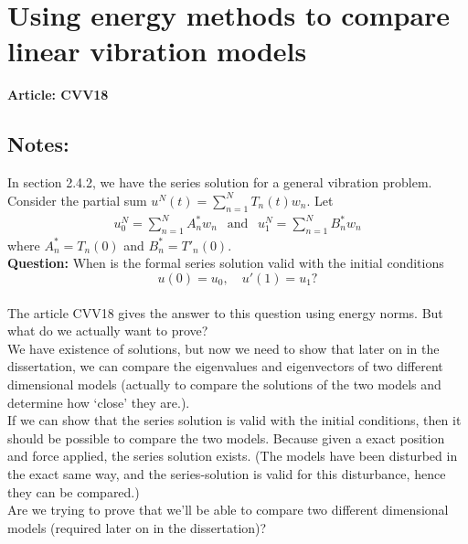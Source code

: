 \documentclass[12pt]{article}
\begin{document}
\section*{Using energy methods to compare linear vibration models}

\textbf{Article: CVV18}\\

\subsection*{Notes:}

In section 2.4.2, we have the series solution for a general vibration problem.\\ 

Consider the partial sum $u^{N}(t) = \sum_{n=1}^{N} T_{n}(t)w_n$. Let
\begin{eqnarray*}
	u_0^{N} = \sum_{n=1}^{N} A^*_n w_n \ \ \textrm{ and } \ \ u_{1}^{N} =\sum_{n=1}^{N} B^*_n w_n
\end{eqnarray*} where $A^*_n = T_n(0)$ and $B^*_n = T'_n(0)$.\\


\textbf{Question:} When is the formal series solution valid with the initial conditions \[u(0) = u_0, \quad u'(1) = u_1 ?\]\\

The article CVV18 gives the answer to this question using energy norms. But what do we actually want to prove?\\

We have existence of solutions, but now we need to show that later on in the dissertation, we can compare the eigenvalues and eigenvectors of two different dimensional models (actually to compare the solutions of the two models and determine how `close' they are.).\\

If we can show that the series solution is valid with the initial conditions, then it should be possible to compare the two models. Because given a exact position and force applied, the series solution exists. (The models have been disturbed in the exact same way, and the series-solution is valid for this disturbance, hence they can be compared.)\\

Are we trying to prove that we'll be able to compare two different dimensional models (required later on in the dissertation)?\\
\end{document}
